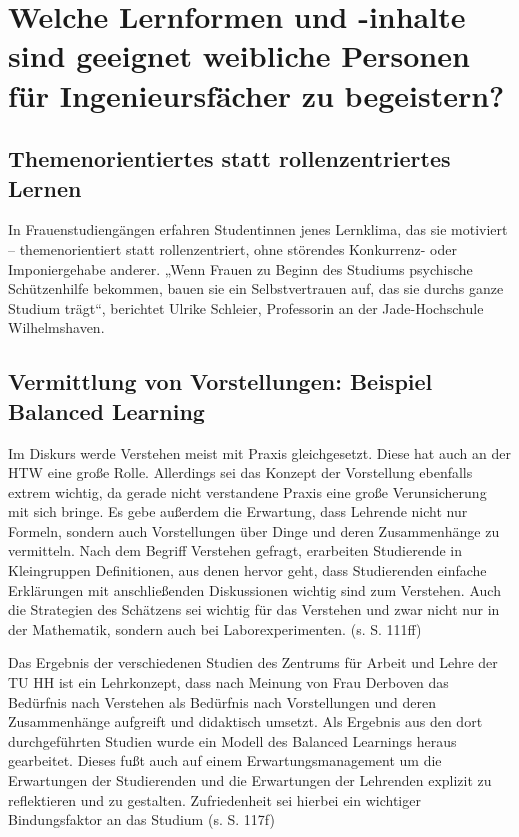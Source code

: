 \documentclass[a4paper, 12 pt]{IEEEtran}
\begin{document}
\section{Welche Lernformen und -inhalte sind geeignet weibliche Personen für Ingenieursfächer zu begeistern?}
\label{sec:LernformenFuerFrauen}

\subsection{Themenorientiertes statt rollenzentriertes Lernen}
In Frauenstudiengängen erfahren Studentinnen jenes Lernklima, das sie motiviert – themenorientiert statt rollenzentriert, ohne störendes Konkurrenz- oder Imponiergehabe anderer. „Wenn Frauen zu Beginn des Studiums psychische Schützenhilfe bekommen, bauen sie ein Selbstvertrauen auf, das sie durchs ganze Studium trägt“, berichtet Ulrike Schleier, Professorin an der Jade-Hochschule Wilhelmshaven. \cite{Kuntzbrunner.23.03.2012}

\subsection{Vermittlung von Vorstellungen: Beispiel Balanced Learning} %
Im Diskurs werde Verstehen meist mit Praxis gleichgesetzt. Diese hat auch an der HTW eine große Rolle. Allerdings sei das Konzept der Vorstellung ebenfalls extrem wichtig, da gerade nicht verstandene Praxis eine große Verunsicherung mit sich bringe. Es gebe außerdem die Erwartung, dass Lehrende nicht nur Formeln, sondern auch Vorstellungen über Dinge und deren Zusammenhänge zu vermitteln. 
Nach dem Begriff Verstehen gefragt, erarbeiten Studierende in Kleingruppen Definitionen, aus denen hervor geht, dass Studierenden einfache Erklärungen mit anschließenden Diskussionen wichtig sind zum Verstehen. Auch die Strategien des Schätzens sei wichtig für das Verstehen und zwar nicht nur in der Mathematik, sondern auch bei Laborexperimenten. (\cite{Derboven.2014}s. S. 111ff)

Das Ergebnis der verschiedenen Studien des Zentrums für Arbeit und Lehre der TU HH
ist ein Lehrkonzept, dass nach Meinung von Frau Derboven das Bedürfnis nach Verstehen als Bedürfnis nach Vorstellungen und deren Zusammenhänge aufgreift und didaktisch umsetzt. Als Ergebnis aus den dort durchgeführten Studien wurde ein Modell des Balanced Learnings heraus gearbeitet. Dieses fußt auch auf einem Erwartungsmanagement um die Erwartungen der Studierenden und die Erwartungen der Lehrenden explizit zu reflektieren und zu gestalten. Zufriedenheit sei hierbei ein wichtiger Bindungsfaktor an das Studium (\cite{Derboven.2014}s. S. 117f)
\end{document}
